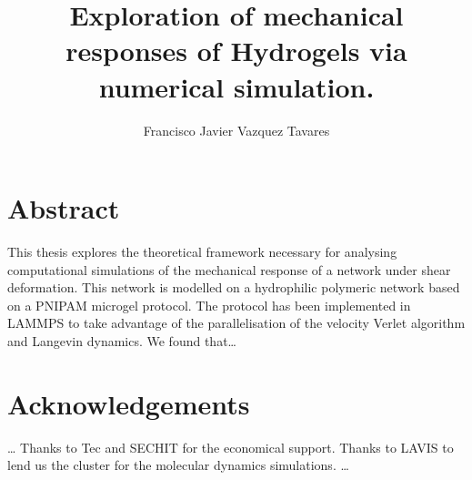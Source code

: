 \documentclass[12pt,colorful,boxey]{tufte-style-thesis}
\author{Francisco Javier Vazquez Tavares}
\title{Exploration of mechanical responses of Hydrogels via numerical simulation.}
\begin{document}
\maketitle

\justifying

\chapter*{Abstract}
This thesis explores the theoretical framework necessary for analysing computational simulations of the mechanical response of a network under shear deformation.
This network is modelled on a hydrophilic polymeric network based on a PNIPAM microgel protocol.
The protocol has been implemented in LAMMPS to take advantage of the parallelisation of the velocity Verlet algorithm and Langevin dynamics.
We found that\ldots


\chapter*{Acknowledgements}
\ldots 
Thanks to Tec and SECHIT for the economical support.
Thanks to LAVIS to lend us the cluster for the molecular dynamics simulations.
\ldots

\tableofcontents
\listoffigures
\listoftables


\mainmatter



\end{document}
